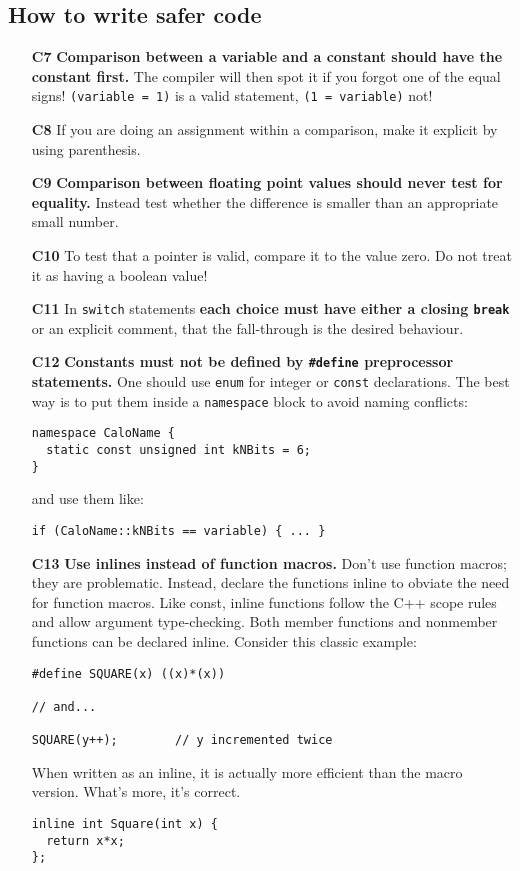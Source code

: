 \subsection{How to write safer code}
\begin{itemize}
\item[\bf C7] {\bf Comparison between a variable and a constant should have
  the constant first.} The compiler will then spot it if you forgot one of
  the equal signs! {\tt (variable = 1)} is a valid statement, 
  {\tt (1 = variable)} not!
\item[\bf C8] If you are doing an assignment within a comparison, make it
  explicit by using parenthesis.
\item[\bf C9] {\bf Comparison between floating point values should never test
  for equality.} Instead test whether the difference is smaller than an
  appropriate small number.
\item[\bf C10] To test that a pointer is valid, compare it to the value zero.
  Do not treat it as having a boolean value!
\item[\bf C11] In {\tt switch} statements {\bf each choice must have either
  a closing {\tt break}} or an explicit comment, that the fall-through is
  the desired behaviour.
\item[\bf C12] {\bf Constants must not be defined by {\tt \#define} preprocessor
  statements.} One should use {\tt enum} for integer or {\tt const} declarations.
  The best way is to put them inside a {\tt namespace} block to avoid
  naming conflicts:
  \begin{verbatim}
namespace CaloName {
  static const unsigned int kNBits = 6;
}
  \end{verbatim}
  and use them like:
  \begin{verbatim}
if (CaloName::kNBits == variable) { ... }
  \end{verbatim}
\item[\bf C13] {\bf Use inlines instead of function macros.} Don't use 
  function macros; they are problematic. Instead, declare the functions 
  inline to obviate the need for function macros.
  Like const, inline functions follow the C++ scope rules and allow argument 
  type-checking. Both member functions and nonmember functions can be 
  declared inline. Consider this classic example:
  \begin{verbatim}
#define SQUARE(x) ((x)*(x))
         
// and...
         
SQUARE(y++);        // y incremented twice
  \end{verbatim}
  When written as an inline, it is actually more efficient than the macro 
  version. What's more, it's correct.
  \begin{verbatim}
inline int Square(int x) {
  return x*x;
};
         

\end{verbatim}
\end{itemize}
